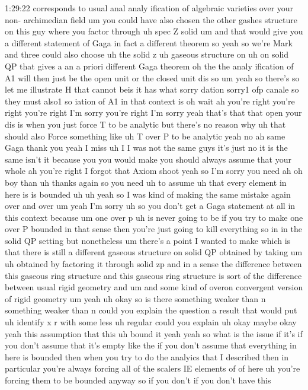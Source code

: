 \begin{unfinished}{1:29:22}
corresponds to usual anal analy
ification of algebraic varieties over
your non- archimedian field um you could
have also chosen the other gashes
structure on this guy where you factor
through uh spec Z solid um and that
would give you a different statement of
Gaga in fact a different theorem so yeah
so we're
Mark and three could also
choose
uh the solid
z uh gaseous
structure on uh on solid
QP that gives a an a priori different
Gaga
theorem oh the the analy ification of A1
will then just be the open unit or the
closed unit
dis so um yeah so there's so let me
illustrate H that cannot
beis it has
what
sorry dation
sorry1
ofp
canale so they must
also1 so iation of A1 in that context is
oh wait ah you're right you're right
you're right I'm sorry you're right I'm
sorry yeah that's that that open your
dis is when you just force T to be
analytic but there's no reason
why
uh that should also Force something like
uh T over P to be analytic yeah no ah
same Gaga thank
you yeah I miss uh I I was not the same
guys it's
just no it is the same isn't it because
you you would
make you should always assume that your
whole
ah
you're right I forgot that Axiom shoot
yeah so I'm sorry you need
ah oh boy than uh thanks again so you
need
uh to
assume uh that every element in here is
is bounded
uh
uh yeah
so I was kind of making the same mistake
again over and over um yeah I'm sorry uh
so you don't get a Gaga statement at all
in this context because
um one over p uh is never going to be if
you try to make one over P bounded in
that sense then you're just going to
kill everything so in in the solid QP
setting but nonetheless um there's a
point I wanted to make which is that
there is still a different gaseous
structure on solid QP obtained by taking
um uh obtained by factoring it through
solid zp
and in a sense the difference between
this gaseous ring structure and this
gaseous ring structure is sort of the
difference between usual rigid geometry
and um and some kind of overon
convergent version of rigid
geometry
um
yeah uh
okay
so is there something weaker than
n something weaker than n could you
explain the
question a result that would put uh
identify x r with some
less uh
regular could you explain uh okay maybe
okay yeah this assumption that this uh
bound it yeah yeah
so what is the issue if it's if you
don't assume that it's empty like the if
you don't assume that everything in here
is bounded then when you try to do the
analyics that I described then in
particular you're always forcing all of
the scalers IE elements of of here uh
you're forcing them to be bounded anyway
so if you don't if you don't have this

\end{unfinished}
